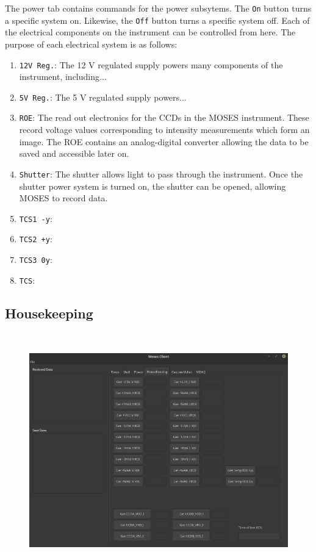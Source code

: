 \documentclass[11pt,titlepage]{article}
\begin{document}
	The power tab contains commands for the power subsytems. The \texttt{On} button turns a specific system on. Likewise, the \texttt{Off} button turns a specific system off. Each of the electrical components on the instrument can be controlled from here. The purpose of each electrical system is as follows:
	\begin{enumerate}
		\item \texttt{12V Reg.}: The 12 V regulated supply powers many components of the instrument, including...
		\item \texttt{5V Reg.}: The 5 V regulated supply powers...
		\item \texttt{ROE}: The read out electronics for the CCDs in the MOSES instrument. These record voltage values corresponding to intensity measurements which form an image. The ROE contains an analog-digital converter allowing the data to be saved and accessible later on.
		\item \texttt{Shutter}: The shutter allows light to pass through the instrument. Once the shutter power system is turned on, the shutter can be opened, allowing MOSES to record data.
		\item \texttt{TCS1 -y}:
		\item \texttt{TCS2 +y}:
		\item \texttt{TCS3 0y}:
		\item \texttt{TCS}:
		
	\end{enumerate}
	

	
	\newpage
	\subsection{Housekeeping}
	\hrulefill
	\\
	
	\begin{figure}[h]
		\includegraphics[width=\textwidth]{EGSE_client_housekeeping}
	\end{figure}
	
\end{document}
